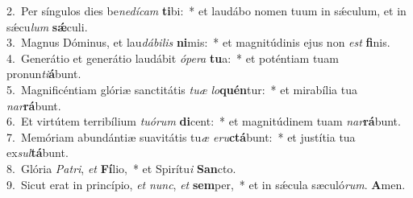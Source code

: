 {2.~}Per síngulos dies be\textit{ne}\textit{dí}\textit{cam} \textbf{ti}bi:~* et laudábo nomen tuum in sǽculum, et in sǽcu\textit{lum} \textbf{sǽ}culi.\\
{3.~}Magnus Dóminus, et lau\textit{dá}\textit{bi}\textit{lis} \textbf{ni}mis:~* et magnitúdinis ejus non \textit{est} \textbf{fi}nis.\\
{4.~}Generátio et generátio laudábit \textit{ó}\textit{pe}\textit{ra} \textbf{tu}a:~* et poténtiam tuam pronun\textit{ti}\textbf{á}bunt.\\
{5.~}Magnificéntiam glóriæ sanctitátis \textit{tu}\textit{æ} \textit{lo}\textbf{quén}tur:~* et mirabília tua \textit{nar}\textbf{rá}bunt.\\
{6.~}Et virtútem terribílium \textit{tu}\textit{ó}\textit{rum} \textbf{di}cent:~* et magnitúdinem tuam \textit{nar}\textbf{rá}bunt.\\
{7.~}Memóriam abundántiæ suavitátis tu\textit{æ} \textit{e}\textit{ru}\textbf{ctá}bunt:~* et justítia tua ex\textit{sul}\textbf{tá}bunt.\\
{8.~}Glória \textit{Pa}\textit{tri}, \textit{et} \textbf{Fí}lio,~* et Spirítu\textit{i} \textbf{San}cto.\\
{9.~}Sicut erat in princípio, \textit{et} \textit{nunc}, \textit{et} \textbf{sem}per,~* et in sǽcula sæculó\textit{rum}. \textbf{A}men.\\
